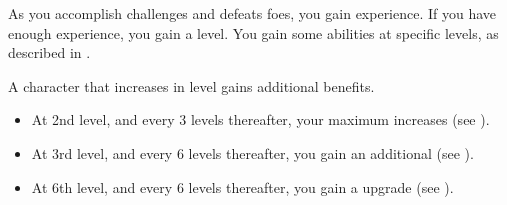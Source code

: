     As you accomplish challenges and defeats foes, you gain experience.
    If you have enough experience, you gain a level.
    You gain some abilities at specific levels, as described in .

    A character that increases in level gains additional benefits.
    \begin{itemize}
        \item At 2nd level, and every 3 levels thereafter, your maximum  increases (see ).
        \item At 3rd level, and every 6 levels thereafter, you gain an additional  (see ).
        \item At 6th level, and every 6 levels thereafter, you gain a  upgrade (see ).
    \end{itemize}

